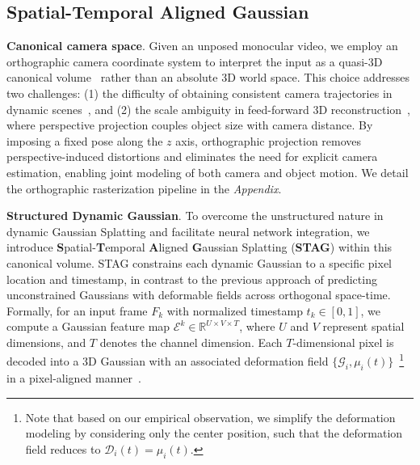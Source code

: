 \subsection{Spatial-Temporal Aligned Gaussian}
\label{stag}
\noindent \textbf{Canonical camera space}. Given an unposed monocular video, we employ an orthographic camera coordinate system to interpret the input as a quasi-3D canonical volume~\cite{wang2023tracking,sun2024splatter} rather than an absolute 3D world space. This choice addresses two challenges: (1) the difficulty of obtaining consistent camera trajectories in dynamic scenes~\cite{ullman1979interpretation, schonberger2016structure, pan2024global, wang2024dust3r, wang2024vggsfm}, and (2) the scale ambiguity in feed-forward 3D reconstruction~\cite{pixelsplat, chen2025mvsplat, zhang2024transplat}, where perspective projection couples object size with camera distance. By imposing a fixed pose along the $z$ axis, orthographic projection removes perspective-induced distortions and eliminates the need for explicit camera estimation, enabling joint modeling of both camera and object motion. We detail the orthographic rasterization pipeline in the \textit{Appendix}.


\noindent \textbf{Structured Dynamic Gaussian}. To overcome the unstructured nature in dynamic Gaussian Splatting and facilitate neural network integration, we introduce \textbf{S}patial-\textbf{T}emporal \textbf{A}ligned \textbf{G}aussian Splatting (\textbf{STAG}) within this canonical volume. STAG constrains each dynamic Gaussian to a specific pixel location and timestamp, in contrast to the previous approach of predicting unconstrained Gaussians with deformable fields across orthogonal space-time.
Formally, for an input frame $F_{k}$ with normalized timestamp $t_k \in [0, 1]$, we compute a Gaussian feature map $\mathcal{E}^k \in \mathbb{R}^{U \times V \times T}$, where $U$ and $V$ represent spatial dimensions, and $T$ denotes the channel dimension. Each $T$-dimensional pixel is decoded into a 3D Gaussian with an associated deformation field $\{\mathcal{G}_{i}, \mu_i(t)\}$~\footnote{ Note that based on our empirical observation, we simplify the deformation modeling by considering only the center position, such that the deformation field reduces to $\mathcal{D}_{i}(t) = \mu_i(t)$.} in a pixel-aligned manner~\cite{pixelsplat, szymanowicz2024splatter}.




